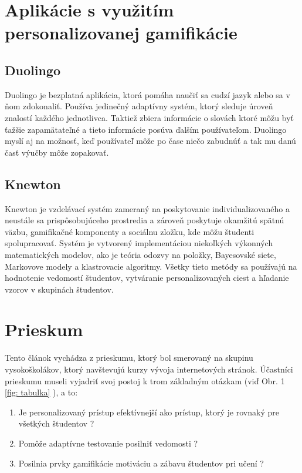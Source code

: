 \documentclass[10pt,twoside,slovak,a4paper]{article}
\begin{document}
\section{Aplikácie s využitím personalizovanej gamifikácie} \label{aplikacie}

\subsection{Duolingo} \label{aplikacie:duolingo}

Duolingo je bezplatná aplikácia, ktorá pomáha naučiť sa cudzí jazyk alebo sa v ňom zdokonaliť. Používa jedinečný adaptívny systém, ktorý sleduje úroveň znalostí každého jednotlivca. Taktiež zbiera informácie o slovách ktoré môžu byť ťažšie zapamätateľné a tieto informácie posúva ďalším používateľom. Duolingo myslí aj na možnosť, keď používateľ môže po čase niečo zabudnúť a tak mu danú časť výučby môže zopakovať. \cite{duolingo}

\subsection{Knewton} \label{aplikacie:knewton}

Knewton je vzdelávací systém zameraný na poskytovanie individualizovaného a neustále sa prispôsobujúceho prostredia a zároveň poskytuje okamžitú spätnú väzbu, gamifikačné komponenty a sociálnu zložku, kde môžu študenti spolupracovať. \cite{knewton} Systém je vytvorený implementáciou niekoľkých výkonných matematických modelov, ako je teória odozvy na položky, Bayesovské siete, Markovove modely a klastrovacie algoritmy. Všetky tieto metódy sa používajú na hodnotenie vedomostí študentov, vytváranie personalizovaných ciest a hľadanie vzorov v skupinách študentov.

\section{Prieskum} \label{prieskum}

Tento článok vychádza z prieskumu\cite{adaptiveGamification}, ktorý bol smerovaný na skupinu vysokoškolákov, ktorý navštevujú kurzy vývoja internetových stránok. Účastníci prieskumu museli vyjadriť svoj postoj k trom základným otázkam (viď Obr. 1 \ref{fig: tabulka} ), a to:
\begin{enumerate}
\item Je personalizovaný prístup efektívnejší ako prístup, ktorý je rovnaký pre všetkých študentov ?
\item Pomôže adaptívne testovanie posilniť vedomosti ? 
\item Posilnia prvky gamifikácie motiváciu a zábavu študentov pri učení ? 
\end{enumerate}
\end{document}
